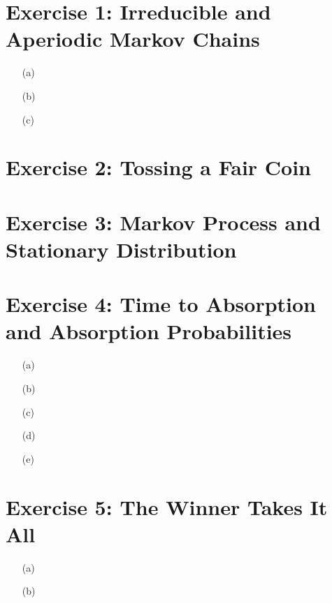 \documentclass[unicode,11pt,a4paper,oneside,numbers=endperiod,openany]{scrartcl}
\begin{document}
\setassignment
{}


\section*{Exercise 1: Irreducible and Aperiodic Markov Chains}

\begin{itemize}
	\item [(a)]
	\item [(b)]
	\item [(c)]
\end{itemize}


\section*{Exercise 2: Tossing a Fair Coin}



\section*{Exercise 3: Markov Process and Stationary Distribution}



\section*{Exercise 4: Time to Absorption and Absorption Probabilities}

\begin{itemize}
	\item [(a)] 
	\item [(b)] 
	\item [(c)] 
	\item [(d)] 
	\item [(e)]
\end{itemize}



\section*{Exercise 5: The Winner Takes It All}

\begin{itemize}
	\item [(a)] 
	\item [(b)] 
\end{itemize}


\end{document}

